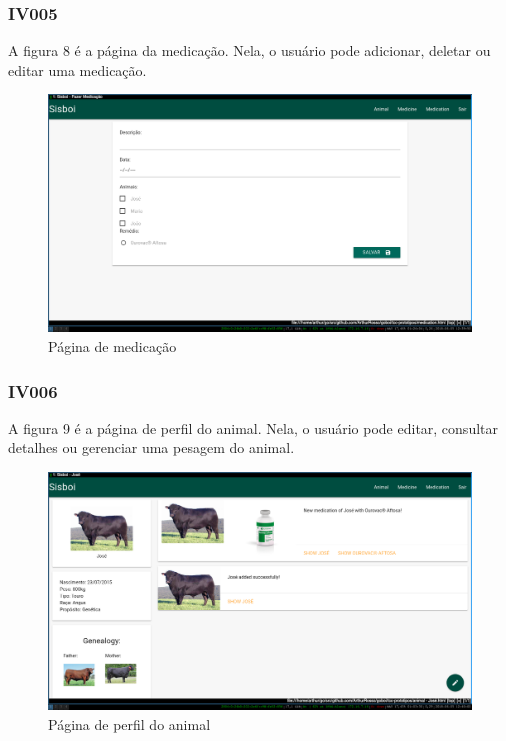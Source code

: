 \documentclass[12pt]{article}
\begin{document}
\begin{titlepage}
\begin{center}
\begin{figure}[!h]
\begin{center}

	\end{center}
\end{figure}

\newpage
\subsubsection{IV005}

A figura 8 é a página da medicação. Nela, o usuário pode adicionar, deletar ou editar uma medicação.
\begin{figure}[!h]
	\begin{center}
		\caption{Página de medicação}
		\includegraphics[width=13cm]{img/prototipos/medicacao.png}


	\end{center}
\end{figure}

\subsubsection{IV006}

A figura 9 é a página de perfil do animal. Nela, o usuário pode editar, consultar detalhes ou gerenciar uma pesagem do animal.
\begin{figure}[!h]
	\begin{center}
		\caption{Página de perfil do animal}
		\includegraphics[width=13cm]{img/prototipos/perfil.png}


\end{center}
\end{figure}
\end{center}
\end{titlepage}
\end{document}
